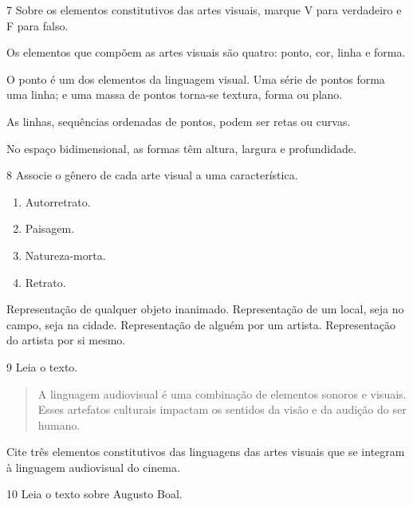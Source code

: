 \num{7} Sobre os elementos constitutivos das artes visuais, marque V para
verdadeiro e F para falso.

\begin{boxlist}
 Os elementos que compõem as artes visuais são quatro: ponto, cor, linha e forma. 

 O ponto é um dos elementos da linguagem visual. Uma série de pontos forma uma linha; e uma massa de pontos torna-se textura, forma ou plano. 

 As linhas, sequências ordenadas de pontos, podem ser retas ou curvas. 

 No espaço bidimensional, as formas têm altura, largura e profundidade. 
\end{boxlist}

\num{8} Associe o gênero de cada arte visual a uma característica.

\begin{enumerate}
  \item Autorretrato.
  \item Paisagem.
  \item Natureza-morta.
  \item Retrato.
\end{enumerate}

\begin{boxlist}
   Representação de qualquer objeto inanimado.
   Representação de um local, seja no campo, seja na cidade.
   Representação de alguém por um artista.
   Representação do artista por si mesmo.
\end{boxlist}

\num{9} Leia o texto.

\begin{quote}
A linguagem audiovisual é uma combinação de elementos sonoros e visuais. Esses artefatos culturais impactam os sentidos da visão e da audição do ser humano.

\end{quote}

Cite três elementos constitutivos das linguagens das artes visuais que
se integram à linguagem audiovisual do cinema.



\num{10} Leia o texto sobre Augusto Boal.

